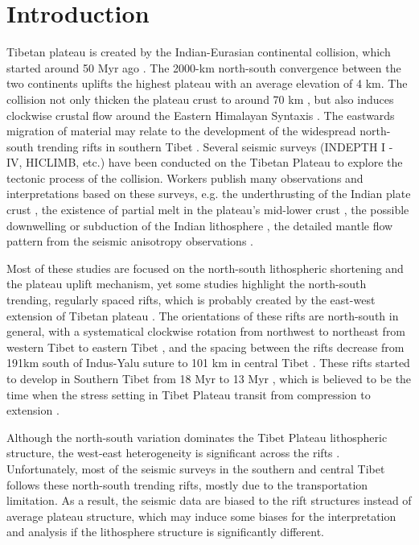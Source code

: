 \section{Introduction}

Tibetan plateau is created by the Indian-Eurasian continental collision, which started around 50 Myr ago \cite{Patriat_1984}. The 2000-km north-south convergence between the two continents uplifts the highest plateau with an average elevation of 4 km. The collision not only thicken the plateau crust to around 70 km \cite[e.g.][]{Nabelek_2009}, but also induces clockwise crustal flow around the Eastern Himalayan Syntaxis \cite{Gan_2007}. The eastwards migration of material may relate to the development of the widespread north-south trending rifts in southern Tibet \cite[e.g.][]{Yin_2000,Zhang_2013}. 
Several seismic surveys (INDEPTH I - IV, HICLIMB, etc.) have been conducted on the Tibetan Plateau to explore the tectonic process of the collision. Workers publish many observations and interpretations based on these surveys, e.g. the underthrusting of the Indian plate crust \cite{Zhao_1993}, the existence of partial melt in the plateau’s mid-lower crust \cite{Brown_1996}, the possible downwelling or subduction of the Indian lithosphere \cite[e.g.][]{Tilmann_2003,Li_2008,Nabelek_2009}, the detailed mantle flow pattern from the seismic anisotropy observations \cite[e.g.][]{Hirn_1995,Huang_2000,Fu_2008}.

Most of these studies are focused on the north-south lithospheric shortening and the plateau uplift mechanism, yet some studies highlight the north-south trending, regularly spaced rifts, which is probably created by the east-west extension of Tibetan plateau \cite[e.g.][]{Molnar_1978,Armijo_1986,Yin_2000,Kapp_2004,Kapp_2008}. The orientations of these rifts are north-south in general, with a systematical clockwise rotation from northwest to northeast from western Tibet to eastern Tibet \cite{Kapp_2004}, and the spacing between the rifts decrease from 191km south of Indus-Yalu suture to 101 km in central Tibet \cite{Yin_2000}. These rifts started to develop in Southern Tibet from 18 Myr to 13 Myr \cite{Williams_2001}, which is believed to be the time when the stress setting in Tibet Plateau transit from compression to extension \cite{Kapp_2005}.

Although the north-south variation dominates the Tibet Plateau lithospheric structure, the west-east heterogeneity is significant across the rifts \cite{Zhang_2005}. Unfortunately, most of the seismic surveys in the southern and central Tibet follows these north-south trending rifts, mostly due to the transportation limitation. As a result, the seismic data are biased to the rift structures instead of average plateau structure, which may induce some biases for the interpretation and analysis if the lithosphere structure is significantly different.

